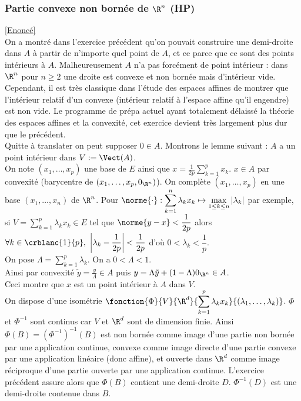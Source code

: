 \documentclass{book}
\begin{document}
	\subsubsection{Partie convexe non bornée de $\R^n$ (HP) }
	\label{Partie convexe non bornée de R^n corrigé}
	\textcolor{blue}{\hyperref[Partie convexe non bornée de R^n]{[Enoncé]}}\\
	On a montré dans l'exercice précédent qu'on pouvait construire une demi-droite dans $A$ à partir de n'importe quel point de $A$, et ce parce que ce sont des points intérieurs à $A$. Malheureusement $A$ n'a pas forcément de point intérieur : dans $\R^n$ pour $n\geq 2$ une droite est convexe et non bornée mais d'intérieur vide. Cependant, il est très classique dans l'étude des espaces affines de montrer que l'intérieur relatif d'un convexe (intérieur relatif à l'espace affine qu'il engendre) est non vide. Le programme de prépa actuel ayant totalement délaissé la théorie des espaces affines et la convexité, cet exercice devient très largement plus dur que le précédent.\\
	Quitte à translater on peut supposer $0\in A$.
	Montrons le lemme suivant : $A$ a un point intérieur dans $V:=\Vect(A)$.\\
	On note $(x_1,\dots,x_p)$ une base de $E$ ainsi que $x=\displaystyle\frac{1}{2p}\sum_{k=1}^px_k$. $x\in A$ par convexité (barycentre de $(x_1,\dots,x_p,0_{\R^n})$). On complète $(x_1,\dots,x_p)$ en une base $(x_1,\dots,x_n)$ de $\R^n$. Pour $\norme{\cdot}:\displaystyle\sum_{k=1}^n\lambda_kx_k\mapsto \max\limits_{1\leq k\leq n}|\lambda_k|$ par exemple, si $V=\displaystyle\sum_{k=1}^p\lambda_kx_k\in E$ tel que $\norme{y-x}<\dfrac{1}{2p}$ alors $\forall k\in \crblanc{1}{p},\ \displaystyle\left|\lambda_k-\frac{1}{2p}\right|<\frac{1}{2p}$ d'où $0<\lambda_k<\dfrac{1}{p}$.\\
	On pose $\Lambda=\displaystyle\sum_{k=1}^p\lambda_k$. On a $0<\Lambda<1$.\\
	Ainsi par convexité $\tilde y=\displaystyle\frac{y}{\Lambda}\in A$ puis $y=\Lambda\tilde y+(1-\Lambda)0_{\R^n}\in A$.\\
	Ceci montre que $x$ est un point intérieur à $A$ dans $V$.\\
	On dispose d'une isométrie $\fonction{\Phi}{V}{\R^d}{\displaystyle\sum_{k=1}^p\lambda_kx_k}{(\lambda_1,\dots,\lambda_k)}$. $\Phi$ et $\Phi^{-1}$ sont continus car $V$ et $\R^d$ sont de dimension finie. Ainsi $\Phi(B)=(\Phi^{-1})^{-1}(B)$ est non bornée comme image d'une partie non bornée par une application continue, convexe comme image directe d'une partie convexe par une application linéaire (donc affine), et ouverte dans $\R^d$ comme image réciproque d'une partie ouverte par une application continue. L'exercice précédent assure alors que $\Phi(B)$ contient une demi-droite $D$. $\Phi^{-1}(D)$ est une demi-droite contenue dans $B$.
	
\end{document}
